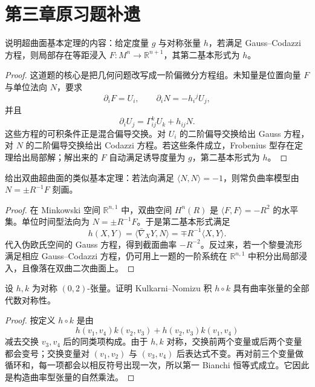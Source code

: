 \documentclass[11pt,a4paper,openany]{ctexbook}
\numberwithin{equation}{chapter}
\begin{document}
\section{第三章原习题补遗}

\begin{problem}
说明超曲面基本定理的内容：给定度量 \(g\) 与对称张量 \(h\)，若满足 Gauss--Codazzi 方程，则局部存在等距浸入 \(F\colon M^n\to\mathbb R^{n+1}\)，其第二基本形式为 \(h\)。
\end{problem}
\begin{proof}
这道题的核心是把几何问题改写成一阶偏微分方程组。未知量是位置向量 \(F\) 与单位法向 \(N\)，要求
\[
\partial_iF=U_i,\qquad \partial_iN=-h_i{}^jU_j,
\]
并且
\[
\partial_iU_j=\Gamma^k_{ij}U_k+h_{ij}N.
\]
这些方程的可积条件正是混合偏导交换。对 \(U_i\) 的二阶偏导交换给出 Gauss 方程，对 \(N\) 的二阶偏导交换给出 Codazzi 方程。若这些条件成立，Frobenius 型存在定理给出局部解；解出来的 \(F\) 自动满足诱导度量为 \(g\)，第二基本形式为 \(h\)。
\end{proof}

\begin{problem}
给出双曲超曲面的类似基本定理：若法向满足 \(\langle N,N\rangle=-1\)，则常负曲率模型由 \(N=\pm R^{-1}F\) 刻画。
\end{problem}
\begin{proof}
在 Minkowski 空间 \(\mathbb R^{n,1}\) 中，双曲空间 \(H^n(R)\) 是 \(\langle F,F\rangle=-R^2\) 的水平集。单位时间型法向为 \(N=\pm R^{-1}F\)。于是第二基本形式满足
\[
h(X,Y)=\langle \bar\nabla_XY,N\rangle=\mp R^{-1}\langle X,Y\rangle.
\]
代入伪欧氏空间的 Gauss 方程，得到截面曲率 \(-R^{-2}\)。反过来，若一个黎曼流形满足相应 Gauss--Codazzi 方程，仍可用上一题的一阶系统在 \(\mathbb R^{n,1}\) 中积分出局部浸入，且像落在双曲二次曲面上。
\end{proof}

\begin{problem}
设 \(h,k\) 为对称 \((0,2)\)-张量。证明 Kulkarni--Nomizu 积 \(h\circ k\) 具有曲率张量的全部代数对称性。
\end{problem}
\begin{proof}
按定义 \(h\circ k\) 是由
\[
h(v_1,v_4)k(v_2,v_3)+h(v_2,v_3)k(v_1,v_4)
\]
减去交换 \(v_3,v_4\) 后的同类项构成。由于 \(h,k\) 对称，交换前两个变量或后两个变量都会变号；交换变量对 \((v_1,v_2)\) 与 \((v_3,v_4)\) 后表达式不变。再对前三个变量做循环和，每一项都会以相反符号出现一次，所以第一 Bianchi 恒等式成立。它因此是构造曲率型张量的自然乘法。
\end{proof}
\end{document}
